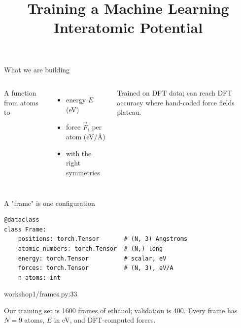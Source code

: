 \documentclass[aspectratio=169,11pt]{beamer}
\title{Training a Machine Learning Interatomic Potential}
\date{}
\author{}
\newcommand{\srcref}[1]{{\color{muted}\ttfamily\footnotesize #1}}
\begin{document}
\begin{frame}[plain]
  \titlepage
\end{frame}

\begin{frame}{What we are building}
  \begin{columns}[T]
      A function from atoms to
      \begin{itemize}
        \item energy $E$ (eV)
        \item force $\vec{F}_i$ per atom (eV/\AA)
        \item with the right symmetries
      \end{itemize}

      \vspace{0.8em}
      Trained on DFT data; can reach DFT accuracy where hand-coded
      force fields plateau.

      \centering
  \end{columns}
\end{frame}

\begin{frame}[fragile]{A "frame" is one configuration}
  \vspace{-0.3em}
\begin{lstlisting}
@dataclass
class Frame:
    positions: torch.Tensor       # (N, 3) Angstroms
    atomic_numbers: torch.Tensor  # (N,) long
    energy: torch.Tensor          # scalar, eV
    forces: torch.Tensor          # (N, 3), eV/A
    n_atoms: int
\end{lstlisting}
  \vspace{0.4em}
  \srcref{workshop1/frames.py:33}

  \vspace{0.8em}
  Our training set is 1600 frames of ethanol; validation is 400.
  Every frame has $N=9$ atoms, $E$ in eV, and DFT-computed forces.
\end{frame}
\end{document}

